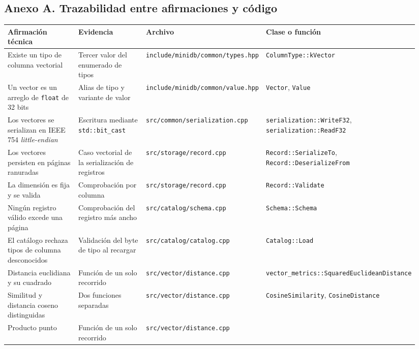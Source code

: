 \documentclass[11pt,a4paper]{article}
\let\subsection\section
\begin{document}
\begin{landscape}
\subsection{Anexo A. Trazabilidad entre afirmaciones y
código}\label{anexo-a-trazabilidad-entre-afirmaciones-y-cuxf3digo}

\begin{longtable}[]{@{}L{0.20\linewidth}L{0.18\linewidth}L{0.24\linewidth}L{0.32\linewidth}@{}}
\toprule\noalign{}
Afirmación técnica & Evidencia & Archivo & Clase o función \\
\midrule\noalign{}
\endhead
\bottomrule\noalign{}
\endlastfoot
Existe un tipo de columna vectorial & Tercer valor del enumerado de
tipos & \texttt{include/minidb/common/types.hpp} &
\texttt{ColumnType::kVector} \\
Un vector es un arreglo de \texttt{float} de 32 bits & Alias de tipo y
variante de valor & \texttt{include/minidb/common/value.hpp} &
\texttt{Vector}, \texttt{Value} \\
Los vectores se serializan en IEEE 754 \emph{little-endian} & Escritura
mediante \texttt{std::bit\_cast} & \texttt{src/common/serialization.cpp}
& \texttt{serialization::WriteF32}, \texttt{serialization::ReadF32} \\
Los vectores persisten en páginas ranuradas & Caso vectorial de la
serialización de registros & \texttt{src/storage/record.cpp} &
\texttt{Record::SerializeTo}, \texttt{Record::DeserializeFrom} \\
La dimensión es fija y se valida & Comprobación por columna &
\texttt{src/storage/record.cpp} & \texttt{Record::Validate} \\
Ningún registro válido excede una página & Comprobación del registro más
ancho & \texttt{src/catalog/schema.cpp} & \texttt{Schema::Schema} \\
El catálogo rechaza tipos de columna desconocidos & Validación del byte
de tipo al recargar & \texttt{src/catalog/catalog.cpp} &
\texttt{Catalog::Load} \\
Distancia euclidiana y su cuadrado & Función de un solo recorrido &
\texttt{src/vector/distance.cpp} &
\texttt{vector\_metrics::SquaredEuclideanDistance} \\
Similitud y distancia coseno distinguidas & Dos funciones separadas &
\texttt{src/vector/distance.cpp} & \texttt{CosineSimilarity},
\texttt{CosineDistance} \\
Producto punto & Función de un solo recorrido &
\texttt{src/vector/distance.cpp} &

\end{longtable}
\end{landscape}
\end{document}
